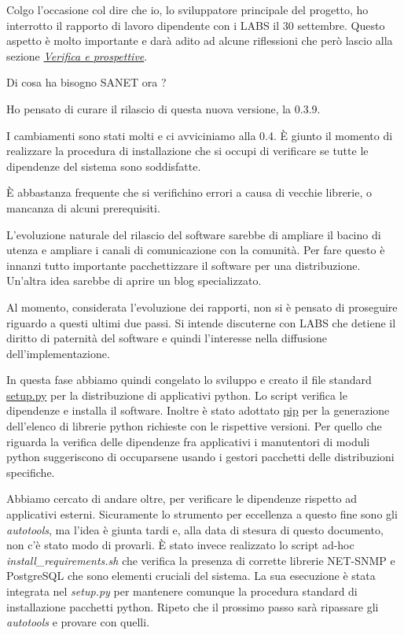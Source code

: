\documentclass[a4wide,10pt,italian]{manual}
\begin{document}
Colgo l'occasione col dire che io, lo sviluppatore principale del progetto,
ho interrotto il rapporto di lavoro dipendente con i LABS il 30 settembre.
Questo aspetto è molto importante e darà adito ad alcune riflessioni che però lascio alla sezione
\hyperlink{retrospective-and-future}{\emph{Verifica e prospettive}}.

Di cosa ha bisogno SANET ora ?

Ho pensato di curare il rilascio di questa nuova versione, la 0.3.9.

I cambiamenti sono stati molti e ci avviciniamo alla 0.4.
È giunto il momento di realizzare la procedura di installazione che si occupi
di verificare se tutte le dipendenze del sistema sono soddisfatte.

È abbastanza frequente che si verifichino errori a causa di vecchie librerie,
o mancanza di alcuni prerequisiti.

L'evoluzione naturale del rilascio del software sarebbe di ampliare il bacino
di utenza e ampliare i canali di comunicazione con la comunità. Per fare questo
è innanzi tutto importante pacchettizzare il software per una distribuzione.
Un'altra idea sarebbe di aprire un blog specializzato.

Al momento, considerata l'evoluzione dei rapporti, non si è pensato di
proseguire riguardo a questi ultimi due passi. Si intende discuterne con LABS
che detiene il diritto di paternità del software e quindi l'interesse nella diffusione
dell'implementazione.

In questa fase abbiamo quindi congelato lo sviluppo e creato il file standard \href{http://docs.python.org/distutils/setupscript.html}{setup.py}
per la distribuzione di applicativi python. Lo script verifica le dipendenze
e installa il software. Inoltre è stato adottato \href{http://pip.openplans.org/}{pip} per la generazione
dell'elenco di librerie python richieste con le rispettive versioni.
Per quello che riguarda la verifica delle dipendenze fra applicativi i manutentori di moduli python
suggeriscono di occuparsene usando i gestori pacchetti delle distribuzioni specifiche.

Abbiamo cercato di andare oltre, per verificare le dipendenze rispetto ad applicativi
esterni. Sicuramente lo strumento per eccellenza a questo fine sono gli \emph{autotools}, ma
l'idea è giunta tardi e, alla data di stesura di questo documento, non c'è stato modo di provarli.
È stato invece realizzato lo script ad-hoc \emph{install\_requirements.sh} che verifica la presenza di corrette librerie
NET-SNMP e PostgreSQL che sono elementi cruciali del sistema.
La sua esecuzione è stata integrata nel \emph{setup.py} per mantenere comunque la procedura standard
di installazione pacchetti python.
Ripeto che il prossimo passo sarà ripassare gli \emph{autotools} e provare con quelli.
\end{document}
